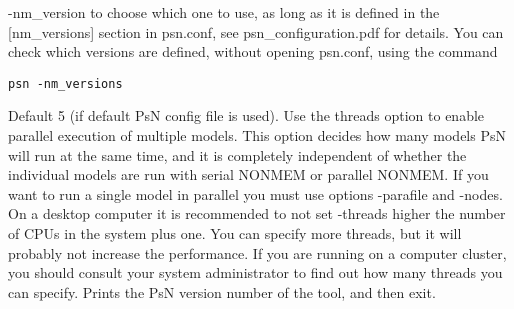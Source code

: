\begin{optionlist}
-nm\_version to choose which one to use, as long as it is 
defined in the [nm\_versions] section in psn.conf, see psn\_configuration.pdf for details. 
You can check which versions are defined, without opening psn.conf, using the command
\begin{verbatim}
psn -nm_versions
\end{verbatim}
\nextopt
{}
Default 5 (if default PsN config file is used). 
Use the threads option to enable parallel execution of multiple models.
This option decides how many models PsN will run at the same time, and it is completely
independent of whether the individual models are run with serial NONMEM or parallel NONMEM.
If you want to run a single model in parallel you must use options -parafile and -nodes.
On a desktop computer it 
is recommended to not set -threads higher the number of CPUs in the system plus one. 
You can specify more threads, 
but it will probably not increase the performance. If you are running on a computer cluster, 
you should consult your 
system administrator to find out how many threads you can specify. 
\nextopt
{}
Prints the PsN version number of the tool, and then exit. 
\nextopt
\end{optionlist}
